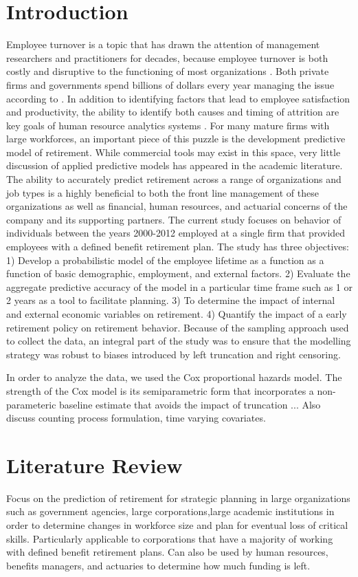 \documentclass[12pt,letterpaper]{article}
\begin{document}
\section{Introduction}
Employee turnover is a topic that has drawn the attention of management researchers and practitioners for decades, because employee turnover is both costly and disruptive to the functioning of most organizations \citep{staw1980, mueller1989, kacmar2006}.  Both private firms and governments spend billions of dollars every year managing the issue according to \citet{leonard2001}. In addition to identifying factors that lead to employee satisfaction and  productivity, the ability to identify both causes and timing of attrition are key goals of human resource analytics systems \citep{IBM.hr analytics}. For many mature firms with large workforces, an important piece of this puzzle is the development predictive model of retirement.  While commercial tools may exist in this space, very little discussion of applied predictive models has appeared in the academic literature.  The ability to accurately predict retirement across a range of organizations and job types is a highly beneficial to both the front line management of these organizations as well as financial, human resources, and actuarial concerns of the company and its supporting partners.
The current study focuses on behavior of individuals between the years 2000-2012 employed at a single firm that provided employees with a defined benefit retirement plan.  The study has three objectives: 1) Develop a probabilistic model of the employee lifetime as a function as a function of basic demographic, employment, and external factors.  2) Evaluate the aggregate predictive accuracy of the model in a particular time frame such as 1 or 2 years as a tool to facilitate planning. 3) To determine the impact of internal and external economic variables on retirement. 4) Quantify the impact of a early retirement policy on retirement behavior.  Because of the sampling approach used to collect the data, an integral part of the study was to ensure that the modelling strategy was robust to biases introduced by left truncation and right censoring.

In order to analyze the data, we used the Cox proportional hazards model.  The strength of the Cox model is its semiparametric form that incorporates a non-parameteric baseline estimate that avoids the impact of truncation ... Also discuss counting process formulation, time varying covariates.
\section{Literature Review}
Focus on the prediction of retirement for strategic planning in large organizations such as government agencies, large corporations,large academic institutions in order to determine changes in workforce size and plan for eventual loss of critical skills.  Particularly applicable to corporations that have a majority of working with defined benefit retirement plans.   Can also be used by human resources, benefits managers, and actuaries to determine how much funding is left.
\end{document}
